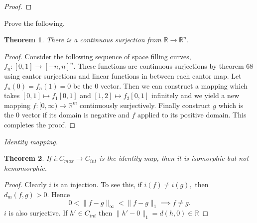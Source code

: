 \documentclass[letter]{article}
\newtheorem{theorem}{Theorem}
\newenvironment{menumerate}{%
  \edef\backupindent{\the\parindent}%
  \enumerate%
  \setlength{\parindent}{\backupindent}%
}{\endenumerate}
\begin{document}
\begin{menumerate}
\begin{proof}
		\end{proof}
	\item Prove the following.
		\begin{theorem}
			There is a continuous surjection from $\mathbb{R} \to \mathbb{R}^n.$ 
		\end{theorem}
		\begin{proof}
			Consider the following sequence of space filling curves, $f_n : [0,1] \to [-n,n]^n.$ These functions are continuous surjections by theorem $68$ using cantor surjections and linear functions in between each cantor map. Let $f_n(0) = f_n(1) = 0$ be the $0$ vector. Then we can construct a mapping which takes $[0,1] \mapsto f_1[0,1]$ and $[1,2] \mapsto f_2[0,1]$ infinitely and we yield a new mapping $f: [0,\infty) \to \mathbb{R}^m$ continuously surjectively. Finally construct $g$ which is the 0 vector if its domain is negative and $f$ applied to its positive domain. This completes the proof. 
		\end{proof}
	\setcounter{enumi}{107}
	\item \emph{Identity mapping.}
		\begin{theorem}
			If $i: C_{max} \to C_{int}$ is the identity map, then it is isomorphic but not hemomorphic.
		\end{theorem}
		\begin{proof}
		Clearly $i$ is an injection. To see this, if $i(f) \neq i(g),$ then $d_m(f,g) > 0.$ Hence $$0 < \|f -g \|_\infty < \|f-g\|_1 \implies f \neq g.$$  $i$ is also surjective. If $h' \in C_{int}$ then $\|h'-0\|_1 = d(h,0) \in \mathbb{R}$
 		\end{proof}
\end{menumerate}
\end{document}
